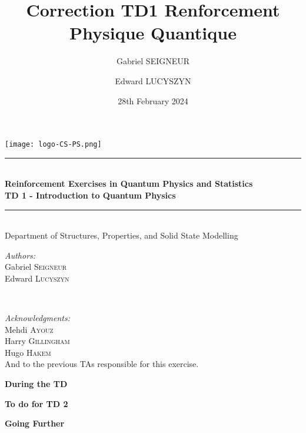 \documentclass[a4paper, 11pt]{article}
\title{\textbf{Correction TD1 Renforcement Physique Quantique}}
\author{Gabriel \textsc{SEIGNEUR} \and Edward \textsc{LUCYSZYN}}
\date{28th February 2024}
\begin{document}
\begin{titlepage}
\newcommand{\HRule}{\rule{\linewidth}{0.5mm}}
\center
\texttt{[image: logo-CS-PS.png]} \\[1cm]
\HRule \\[0.4cm]
{ \huge \bfseries Reinforcement Exercises in Quantum Physics and Statistics\\[0.15cm] TD 1 - Introduction to Quantum Physics \\[0.15cm]}
\HRule \\[1.5cm]
\LARGE Department of Structures, Properties, and Solid State Modelling \\ [2.90cm]
\begin{minipage}{0.4\textwidth}
\begin{spacing}{1.125}
\begin{flushleft} \Large
    \textit{Authors: } \\
	Gabriel \textsc{Seigneur} \\
    Edward \textsc{Lucyszyn}
\end{flushleft}
\end{spacing}
\end{minipage} 
\\[1cm]
\begin{minipage}{0.4\textwidth}
\begin{spacing}{1.125}
\begin{flushleft} \Large
    \textit{Acknowledgments: } \\
	Mehdi \textsc{Ayouz} \\
    Harry \textsc{Gillingham} \\
    Hugo \textsc{Hakem} \\
    And to the previous TAs responsible for this exercise.
\end{flushleft}
\end{spacing}
\end{minipage} 
\end{titlepage}

\noindent \LARGE \textbf{During the TD}
\normalsize




\newpage
\noindent \LARGE \textbf{To do for TD 2}
\normalsize


\newpage
\noindent \LARGE \textbf{Going Further}
\normalsize



\end{document}
